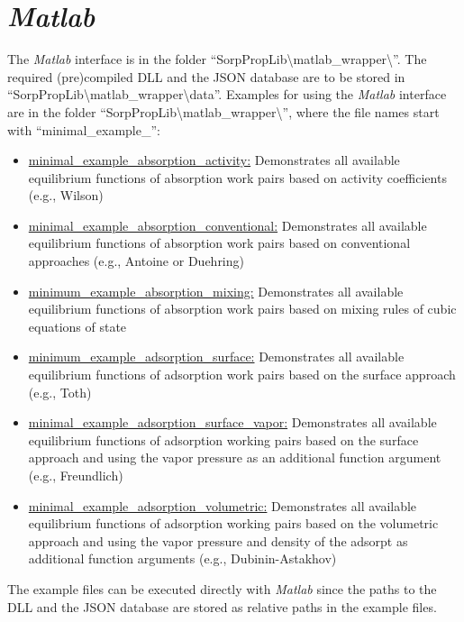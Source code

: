 \section{\textit{Matlab}}
\label{cha:usage:matlab}
%
The \textit{Matlab} interface is in the folder “SorpPropLib\textbackslash matlab\_wrapper\textbackslash ”. The required (pre)compiled DLL and the JSON database are to be stored in “SorpPropLib\textbackslash matlab\_wrapper\textbackslash  data”. Examples for using the \textit{Matlab} interface are in the folder “SorpPropLib\textbackslash matlab\_wrapper\textbackslash ”, where the file names start with “minimal\_example\_”:
\begin{itemize}
	\item \underline{minimal\_example\_absorption\_activity:} Demonstrates all available equilibrium functions of absorption work pairs based on activity coefficients (e.g., Wilson)
	\item \underline{minimal\_example\_absorption\_conventional:} Demonstrates all available equilibrium functions of absorption work pairs based on conventional approaches (e.g., Antoine or Duehring)
	\item \underline{minimum\_example\_absorption\_mixing:} Demonstrates all available equilibrium functions of absorption work pairs based on mixing rules of cubic equations of state
	\item \underline{minimum\_example\_adsorption\_surface:} Demonstrates all available equilibrium functions of adsorption work pairs based on the surface approach (e.g., Toth)
	\item \underline{minimal\_example\_adsorption\_surface\_vapor:} Demonstrates all available equilibrium functions of adsorption working pairs based on the surface approach and using the vapor pressure as an additional function argument (e.g., Freundlich)
	\item \underline{minimal\_example\_adsorption\_volumetric:} Demonstrates all available equilibrium functions of adsorption working pairs based on the volumetric approach and using the vapor pressure and density of the adsorpt as additional function arguments (e.g., Dubinin-Astakhov)
\end{itemize}
The example files can be executed directly with \textit{Matlab} since the paths to the DLL and the JSON database are stored as relative paths in the example files.
